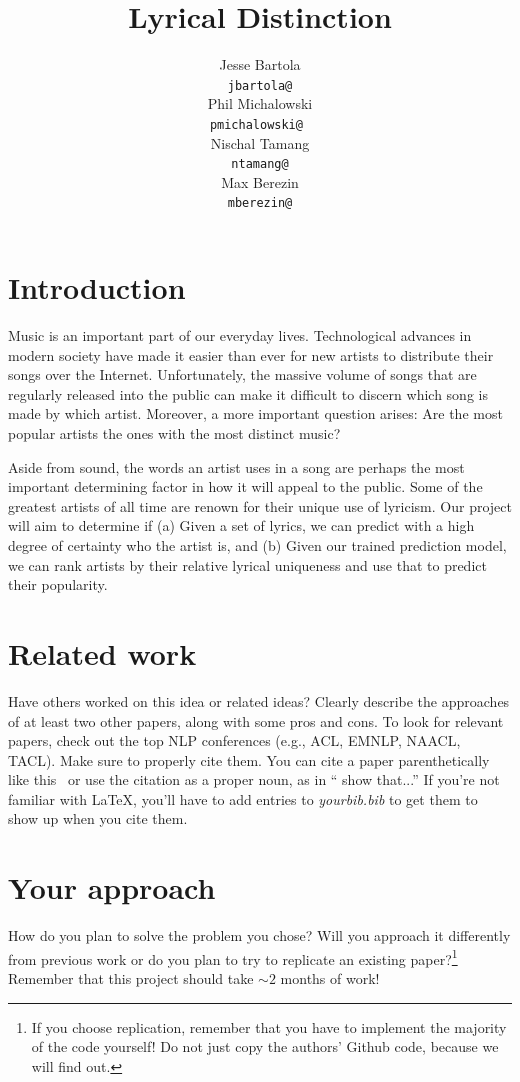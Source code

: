 \documentclass[11pt,a4paper]{article}
\title{Lyrical Distinction}
\author{Jesse Bartola \\
  {\tt jbartola@} \\\And
  Phil Michalowski \\
  {\tt pmichalowski@ } \\\And
  Nischal Tamang \\
  {\tt ntamang@} \\\And
  Max Berezin \\
  {\tt mberezin@} \\}
\date{}
\begin{document}
\maketitle

\section{Introduction}
Music is an important part of our everyday lives. Technological advances in modern society have made it easier than ever for new artists to distribute their songs over the Internet. Unfortunately, the massive volume of songs that are regularly released into the public can make it difficult to discern which song is made by which artist. Moreover, a more important question arises: Are the most popular artists the ones with the most distinct music?

Aside from sound, the words an artist uses in a song are perhaps the most important determining factor in how it will appeal to the public. Some of the greatest artists of all time are renown for their unique use of lyricism. Our project will aim to determine if (a) Given a set of lyrics, we can predict with a high degree of certainty who the artist is, and (b) Given our trained prediction model, we can rank artists by their relative lyrical uniqueness and use that to predict their popularity.


\section{Related work}
Have others worked on this idea or related ideas? Clearly describe the approaches of at least two other papers, along with some pros and cons. To look for relevant papers, check out the top NLP conferences (e.g., ACL, EMNLP, NAACL, TACL). Make sure to properly cite them. You can cite a paper parenthetically like this~\cite{andrew2007scalable} or use the citation as a proper noun, as in `` show that...'' If you're not familiar with LaTeX, you'll have to add entries to \emph{yourbib.bib} to get them to show up when you cite them. 

\section{Your approach}
How do you plan to solve the problem you chose? Will you approach it differently from previous work or do you plan to try to replicate an existing paper?\footnote{If you choose replication, remember that you have to implement the majority of the code yourself! Do not just copy the authors' Github code, because we will find out.} Remember that this project should take $\sim 2$ months of work!
\end{document}
